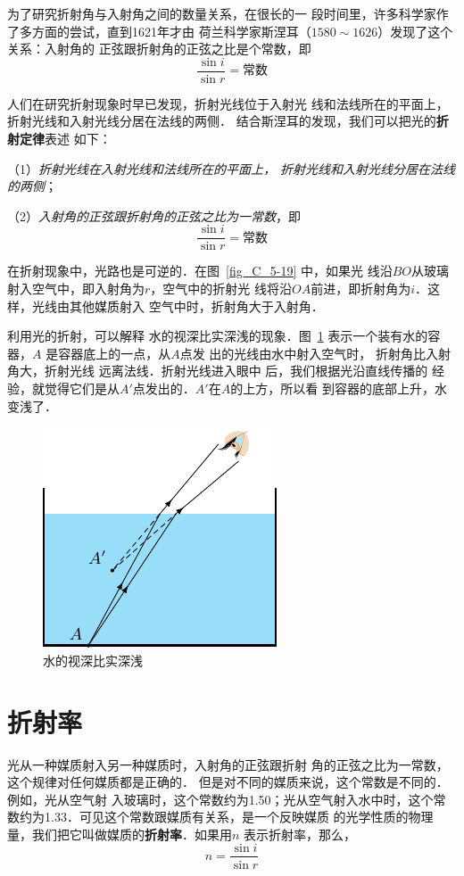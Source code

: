 为了研究折射角与入射角之间的数量关系，在很长的一
段时间里，许多科学家作了多方面的尝试，直到1621年才由
荷兰科学家斯涅耳（$1580 \sim 1626$）发现了这个关系：入射角的
正弦跟折射角的正弦之比是个常数，即
\[\frac{\sin i}{\sin r}=\text{常数}\]

人们在研究折射现象时早已发现，折射光线位于入射光
线和法线所在的平面上，折射光线和入射光线分居在法线的两侧．
结合斯涅耳的发现，我们可以把光的\textbf{折射定律}表述
如下：

（1）\textit{折射光线在入射光线和法线所在的平面上，
折射光线和入射光线分居在法线的两侧}；

（2）\textit{入射角的正弦跟折射角的正弦之比为一常数}，即
\[\frac{\sin i}{\sin r}=\text{常数}\]


在折射现象中，光路也是可逆的．在图~\ref{fig_C_5-19} 中，如果光
线沿$BO$从玻璃射入空气中，即入射角为$r$，空气中的折射光
线将沿$OA$前进，即折射角为$i$．这样，光线由其他媒质射入
空气中时，折射角大于入射角．

利用光的折射，可以解释
水的视深比实深浅的现象．图~\ref{fig_C_5-20} 表示一个装有水的容器，$A$
是容器底上的一点，从$A$点发
出的光线由水中射入空气时，
折射角比入射角大，折射光线
远离法线．折射光线进入眼中
后，我们根据光沿直线传播的
经验，就觉得它们是从$A'$点发出的．$A'$在$A$的上方，所以看
到容器的底部上升，水变浅了．
\begin{figure}[htbp]
    \centering
    \includegraphics{fig/C/5-20.pdf}
    \caption{水的视深比实深浅}\label{fig_C_5-20}
\end{figure}

\section{折射率}\label{sec_C_5-6}
光从一种媒质射入另一种媒质时，入射角的正弦跟折射
角的正弦之比为一常数，这个规律对任何媒质都是正确的．
但是对不同的媒质来说，这个常数是不同的．例如，光从空气射
入玻璃时，这个常数约为1.50；光从空气射入水中时，这个常
数约为1.33．可见这个常数跟媒质有关系，是一个反映媒质
的光学性质的物理量，我们把它叫做媒质的\textbf{折射率}．如果用$n$
表示折射率，那么，
\[n=\frac{\sin i}{\sin r}\]

